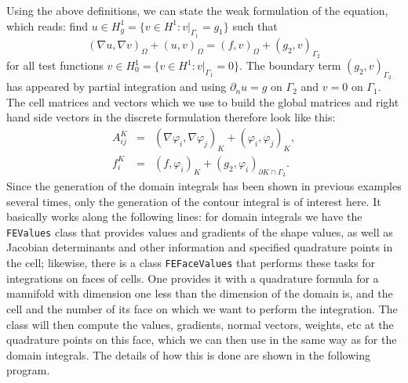 \documentclass{article}
\begin{document}
Using the above definitions, we can state the weak formulation of the
equation, which reads: find $u\in H^1_g=\{v\in H^1: v|_{\Gamma_1}=g_1\}$ such
that
$$
  {(\nabla u, \nabla v)}_\Omega + {(u,v)}_\Omega
  =
  {(f,v)}_\Omega + {(g_2,v)}_{\Gamma_2}
$$
for all test functions $v\in H^1_0=\{v\in H^1: v|_{\Gamma_1}=0\}$. The
boundary term ${(g_2,v)}_{\Gamma_2}$ has appeared by partial integration and
using $\partial_n u=g$ on $\Gamma_2$ and $v=0$ on $\Gamma_1$. The cell
matrices and vectors which we use to build the global matrices and right hand
side vectors in the discrete formulation therefore look like this:
\begin{eqnarray*}
  A_{ij}^K &=& \left(\nabla \varphi_i, \nabla \varphi_j\right)_K
              +\left(\varphi_i, \varphi_j\right)_K,
  \\
  f_i^K &=& \left(f,\varphi_i\right)_K
           +\left(g_2, \varphi_i\right)_{\partial K\cap \Gamma_2}.
\end{eqnarray*}
Since the generation of the domain integrals has been shown in previous
examples several times, only the generation of the contour integral is of
interest here. It basically works along the following lines: for domain
integrals we have the \texttt{FEValues} class that provides values and
gradients of the shape values, as well as Jacobian determinants and other
information and specified quadrature points in the cell; likewise, there is a
class \texttt{FEFaceValues} that performs these tasks for integrations on
faces of cells. One provides it with a quadrature formula for a mannifold with
dimension one less than the dimension of the domain is, and the cell and the
number of its face on which we want to perform the integration. The class will
then compute the values, gradients, normal vectors, weights, etc at the
quadrature points on this face, which we can then use in the same way as for
the domain integrals. The details of how this is done are shown in the
following program.
\end{document}
